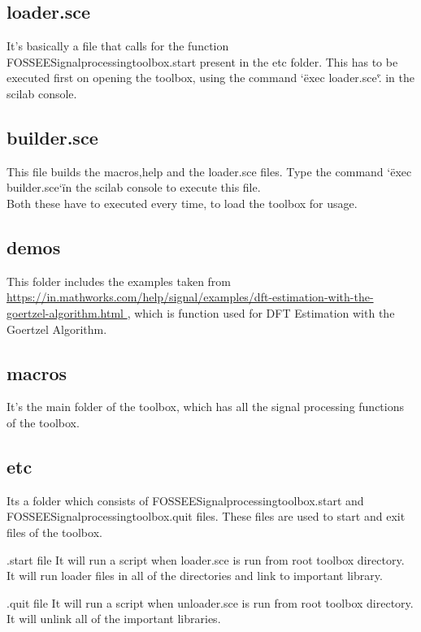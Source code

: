 \documentclass[12pt,a4paper]{report}
\begin{document}
\subsection{loader.sce}
It’s basically a file that calls for the function FOSSEE\textunderscore Signal\textunderscore processing\textunderscore toolbox.start present in the etc folder. This has to be executed first on opening the toolbox, using the command \char`\"exec loader.sce\char`\".
in the scilab console.


\subsection{builder.sce}
This file builds the macros,help and the loader.sce files. Type the command \char`\"exec builder.sce\char`\" in the scilab console to execute this file.\\
Both these have to executed every time, to load the toolbox for usage.

\subsection{demos}
This folder includes the examples taken from  \url{https://in.mathworks.com/help/signal/examples/dft-estimation-with-the-goertzel-algorithm.html }, which is function used for DFT Estimation with the Goertzel Algorithm.

\subsection{macros}
It’s the main folder of the toolbox, which has all the signal processing functions of the toolbox.

\subsection{etc}
Its a folder which consists of FOSSEE\textunderscore Signal\textunderscore processing\textunderscore toolbox.start and FOSSEE\textunderscore Signal\textunderscore processing\textunderscore toolbox.quit files.
These files are used to start and exit files of the toolbox.

.start file
It will run a script when loader.sce is run from root toolbox directory. It will run loader files in all of the directories and link to important library.

.quit file
It will run a script when unloader.sce is run from root toolbox directory. It will unlink all of the important libraries.
\end{document}
